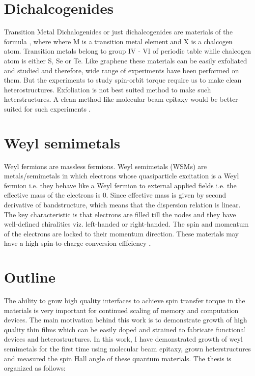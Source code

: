 \section{Dichalcogenides}

Transition Metal Dichalogenides  or just dichalcogenides are materials of the formula
, where where M is a transition metal element and X is a chalcogen atom. Transition
metals belong to group IV - VI of periodic table while chalcogen atom is either S, Se
or Te. Like graphene these materials can be easily exfoliated and studied and therefore,
wide range of experiments have been performed on them. But the experiments to study 
spin-orbit torque require us to make clean heterostructures. Exfoliation
is not best suited method to make such heterstructures. A clean method like molecular beam
epitaxy would be better-suited for such experiments \cite{Manzeli}.

\section{Weyl semimetals}

Weyl fermions are massless fermions. Weyl semimetals (WSMs) are metals/semimetals 
in which electrons whose quasiparticle excitation is a Weyl fermion i.e. they behave 
like a Weyl fermion to external applied fields i.e. the effective mass of the electrons
is 0. Since effective mass is given by second derivative of bandstructure, which means that
the dispersion relation is linear. The key characteristic is that electrons are filled till
the nodes and they have well-defined chiralities viz. left-handed or right-handed. The 
spin and momentum of the electrons are locked to their momentum direction. These materials
may have a high spin-to-charge conversion efffciency \cite{Bansil2016}.

\section{Outline}
The ability to grow high quality interfaces to achieve spin transfer torque in the materials 
is very important for continued scaling of memory and computation devices. The main motivation 
behind this work is to demonstrate growth of high quality thin films which can be easily doped
and  strained to fabricate functional devices and heterostructures. In this work, 
I have demonstrated growth of weyl semimetals for the first time using molecular beam epitaxy, 
grown heterstructures and measured the spin Hall angle of these quantum materials.
The thesis is organized as follows:


